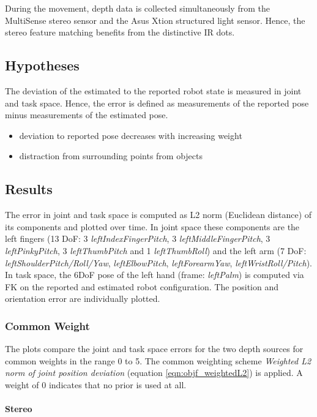 During the movement, depth data is collected simultaneously from the MultiSense stereo sensor and the Asus Xtion structured light sensor. Hence, the stereo feature matching benefits from the distinctive IR dots.

\subsection{Hypotheses}

The deviation of the estimated to the reported robot state is measured in joint and task space. Hence, the error is defined as measurements of the reported pose minus measurements of the estimated pose.

\begin{itemize}
\item deviation to reported pose decreases with increasing weight
\item distraction from surrounding points from objects
\end{itemize}

\subsection{Results}

The error in joint and task space is computed as L2 norm (Euclidean distance) of its components and plotted over time. In joint space these components are the left fingers (13 DoF: 3 \emph{leftIndexFingerPitch}, 3 \emph{leftMiddleFingerPitch}, 3 \emph{leftPinkyPitch}, 3 \emph{leftThumbPitch} and 1 \emph{leftThumbRoll}) and the left arm (7 DoF: \emph{leftShoulderPitch/Roll/Yaw}, \emph{leftElbowPitch}, \emph{leftForearmYaw}, \emph{leftWristRoll/Pitch}). In task space, the 6DoF pose of the left hand (frame: \emph{leftPalm}) is computed via FK on the reported and estimated robot configuration. The position and orientation error are individually plotted.

\subsubsection{Common Weight}

The plots compare the joint and task space errors for the two depth sources for common weights in the range 0 to 5. The common weighting scheme \emph{Weighted L2 norm of joint position deviation} (equation \ref{eqn:objf_weightedL2}) is applied. A weight of 0 indicates that no prior is used at all.

\paragraph{Stereo}

